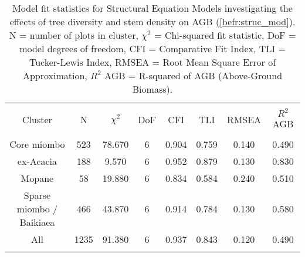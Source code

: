 
\begin{table}[!htbp] \centering 
  	\caption{Model fit statistics for Structural Equation Models investigating the effects of tree diversity and stem density on AGB (\autoref{befr:struc_mod}). N = number of plots in cluster, $\chi^{2}$ = Chi-squared fit statistic, DoF = model degrees of freedom, CFI = Comparative Fit Index, TLI = Tucker-Lewis Index, RMSEA = Root Mean Square Error of Approximation, $R^{2}$ AGB = R-squared of AGB (Above-Ground Biomass).} 
  \label{befr:struc_model_fit_clust_stats} 
\begin{tabular}{@{\extracolsep{0pt}} cccccccc} 
\\[-1.8ex]\hline 
\hline \\[-1.8ex] 
{Cluster} & {N} & {$\chi^{2}$} & {DoF} & {CFI} & {TLI} & {RMSEA} & {$R^{2}$ AGB} \\
\hline \\[-1.8ex] 
Core miombo & 523 & 78.670 & 6 & 0.904 & 0.759 & 0.140 & 0.490 \\ 
ex-Acacia & 188 & 9.570 & 6 & 0.952 & 0.879 & 0.130 & 0.830 \\ 
Mopane & 58 & 19.880 & 6 & 0.834 & 0.584 & 0.240 & 0.510 \\ 
Sparse miombo / Baikiaea & 466 & 43.870 & 6 & 0.914 & 0.784 & 0.130 & 0.580 \\ 
All & 1235 & 91.380 & 6 & 0.937 & 0.843 & 0.120 & 0.490 \\ 
\hline \\[-1.8ex] 
\end{tabular} 
\end{table} 
